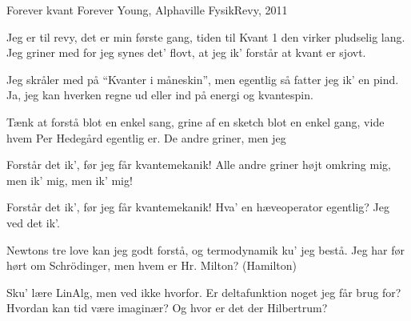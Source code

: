 \begin{song}{Forever kvant}
  {} %
  {Forever Young, Alphaville} %
  {} %
  {FysikRevy, 2011} %
  {\NotCCLIed} %

  \begin{SBVerse}
    Jeg er til revy, det er min første gang,
    tiden til Kvant 1 den virker pludselig lang.
    Jeg griner med for jeg synes det' flovt,
    at jeg ik' forstår at kvant er sjovt.
  \end{SBVerse}

  \begin{SBVerse}
    Jeg skråler med på ``Kvanter i måneskin'',
    men egentlig så fatter jeg ik' en pind.
    Ja, jeg kan hverken regne ud eller ind
    på energi og kvantespin.
  \end{SBVerse}

  \begin{SBVerse}
    Tænk at forstå blot en enkel sang,
    grine af en sketch blot en enkel gang,
    vide hvem Per Hedegård egentlig er.
    De andre griner,
    men jeg
  \end{SBVerse}

  \begin{SBChorus}
    Forstår det ik',
    før jeg får kvantemekanik!
    Alle andre griner højt omkring mig,
    men ik' mig,
    men ik' mig!
  \end{SBChorus}

  \begin{SBChorus}
    Forstår det ik',
    før jeg får kvantemekanik!
    Hva' en hæveoperator egentlig?
    Jeg ved det ik'.
  \end{SBChorus}

  \begin{SBVerse}
    Newtons tre love kan jeg godt forstå,
    og termodynamik ku' jeg bestå.
    Jeg har før hørt om Schrödinger, men
    hvem er Hr. Milton? (Hamilton)
  \end{SBVerse}

  \begin{SBVerse}
    Sku' lære LinAlg, men ved ikke hvorfor.
    Er deltafunktion noget jeg får brug for?
    Hvordan kan tid være imaginær?
    Og hvor er det der Hilbertrum?
  \end{SBVerse}


\end{song}
